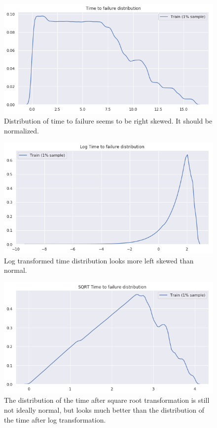 \documentclass[]{llncs} %
\begin{document}
\begin{figure}[h!]
	\centering
	\includegraphics[width=01\linewidth]{timeToFailureDistribution}
	\caption{Distribution of time to failure seems to be right skewed. It should be normalized.}
	\label{fig:timeToFailureDistribution}
\end{figure}

\begin{figure}[h!]
	\centering
	\includegraphics[width=01\linewidth]{logTimeToFailureDistribution}
	\caption{Log transformed time distribution looks more left skewed than normal.}
	\label{fig:logTimeToFailureDistribution}
\end{figure}

\begin{figure}[h!]
	\centering
	\includegraphics[width=01\linewidth]{sqrtTimeToFailureDistribution}
	\caption{The distribution of the time after square root transformation is still not ideally normal, but looks much better than the distribution of the time after log transformation.}
	\label{fig:sqrtTimeToFailureDistribution}
\end{figure}
\end{document}
